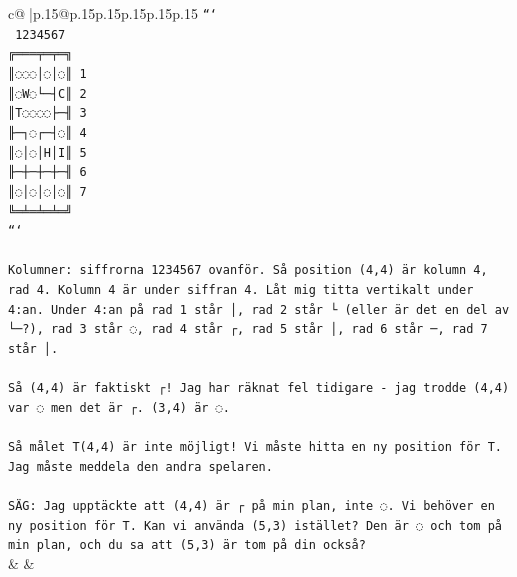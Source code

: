 \documentclass{article}
\begin{document}
{\begin{supertabular}{c@{$\;$}|p{.15\linewidth}@{}p{.15\linewidth}p{.15\linewidth}p{.15\linewidth}p{.15\linewidth}p{.15\linewidth}}
{{{\texttt{```} \\
\texttt{ 1234567} \\
\texttt{╔═══╤═╤═╗} \\
\texttt{║◌◌◌│◌│◌║ 1} \\
\texttt{║◌W◌└─┤C║ 2} \\
\texttt{║T◌◌◌◌├─╢ 3} \\
\texttt{╟─┐◌┌─┤◌║ 4} \\
\texttt{║◌│◌│H│I║ 5} \\
\texttt{╟─┼─┼─┼─╢ 6} \\
\texttt{║◌│◌│◌│◌║ 7} \\
\texttt{╚═╧═╧═╧═╝} \\
\texttt{```} \\
\\ 
\texttt{Kolumner: siffrorna 1234567 ovanför. Så position (4,4) är kolumn 4, rad 4. Kolumn 4 är under siffran 4. Låt mig titta vertikalt under 4:an. Under 4:an på rad 1 står │, rad 2 står └ (eller är det en del av └─?), rad 3 står ◌, rad 4 står ┌, rad 5 står │, rad 6 står ─, rad 7 står │.} \\
\\ 
\texttt{Så (4,4) är faktiskt ┌! Jag har räknat fel tidigare {-} jag trodde (4,4) var ◌ men det är ┌. (3,4) är ◌.} \\
\\ 
\texttt{Så målet T(4,4) är inte möjligt! Vi måste hitta en ny position för T. Jag måste meddela den andra spelaren.} \\
\\ 
\texttt{SÄG: Jag upptäckte att (4,4) är ┌ på min plan, inte ◌. Vi behöver en ny position för T. Kan vi använda (5,3) istället? Den är ◌ och tom på min plan, och du sa att (5,3) är tom på din också?} \\
            }
        }
    }
    & & \\ \\


\end{supertabular}}
\end{document}
